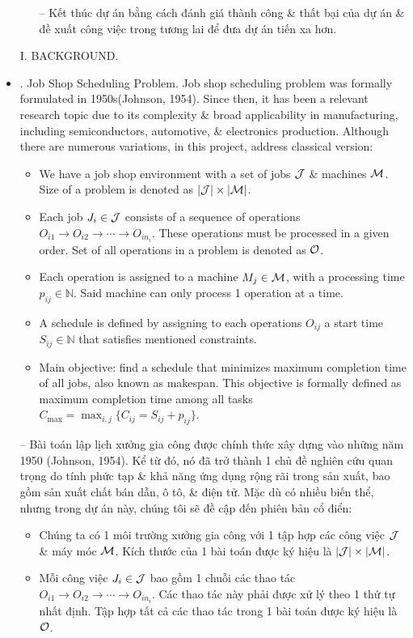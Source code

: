 \documentclass{article}
\begin{document}
\begin{itemize}
\begin{itemize}
        -- Kết thúc dự án bằng cách đánh giá thành công \& thất bại của dự án \& đề xuất công việc trong tương lai để đưa dự án tiến xa hơn.
    \end{itemize}
    I. BACKGROUND.
    \item {. Job Shop Scheduling Problem.} Job shop scheduling problem was formally formulated in 1950s(Johnson, 1954). Since then, it has been a relevant research topic due to its complexity \& broad applicability in manufacturing, including semiconductors, automotive, \& electronics production. Although there are numerous variations, in this project, address classical version:
    \begin{itemize}
        \item We have a job shop environment with a set of jobs ${\cal J}$ \& machines ${\cal M}$. Size of a problem is denoted as $|{\cal J}|\times|{\cal M}|$.
        \item Each job $J_i\in{\cal J}$ consists of a sequence of operations $O_{i1}\to O_{i2}\to\cdots\to O_{in_i}$. These operations must be processed in a given order. Set of all operations in a problem is denoted as ${\cal O}$.
        \item Each operation is assigned to a machine $M_j\in{\cal M}$, with a processing time $p_{ij}\in\mathbb{N}$. Said machine can only process 1 operation at a time.
        \item A schedule is defined by assigning to each operations $O_{ij}$ a start time $S_{ij}\in\mathbb{N}$ that satisfies mentioned constraints.
        \item Main objective: find a schedule that minimizes maximum completion time of all jobs, also known as makespan. This objective is formally defined as maximum completion time among all tasks $C_{\max} = \max_{i,j}\{C_{ij} = S_{ij} + p_{ij}\}$.
    \end{itemize}
    -- Bài toán lập lịch xưởng gia công được chính thức xây dựng vào những năm 1950 (Johnson, 1954). Kể từ đó, nó đã trở thành 1 chủ đề nghiên cứu quan trọng do tính phức tạp \& khả năng ứng dụng rộng rãi trong sản xuất, bao gồm sản xuất chất bán dẫn, ô tô, \& điện tử. Mặc dù có nhiều biến thể, nhưng trong dự án này, chúng tôi sẽ đề cập đến phiên bản cổ điển:
    \begin{itemize}
        \item Chúng ta có 1 môi trường xưởng gia công với 1 tập hợp các công việc ${\cal J}$ \& máy móc ${\cal M}$. Kích thước của 1 bài toán được ký hiệu là $|{\cal J}|\times|{\cal M}|$.
        \item Mỗi công việc $J_i\in{\cal J}$ bao gồm 1 chuỗi các thao tác $O_{i1}\to O_{i2}\to\cdots\to O_{in_i}$. Các thao tác này phải được xử lý theo 1 thứ tự nhất định. Tập hợp tất cả các thao tác trong 1 bài toán được ký hiệu là ${\cal O}$.

\end{itemize}
\end{itemize}
\end{document}
